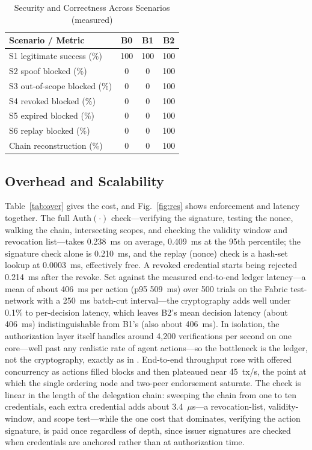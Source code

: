 \documentclass[conference]{IEEEtran}
\begin{document}
\begin{table}[t]
\centering
\caption{Security and Correctness Across Scenarios (measured)}
\label{tab:sec}
\renewcommand{\arraystretch}{1.2}
\begin{tabular}{@{}lccc@{}}
\toprule
\textbf{Scenario / Metric} & \textbf{B0} & \textbf{B1} & \textbf{B2}\\
\midrule
S1 legitimate success (\%)    & 100 & 100 & 100\\
S2 spoof blocked (\%)         & 0   & 0   & 100\\
S3 out-of-scope blocked (\%)  & 0   & 0   & 100\\
S4 revoked blocked (\%)       & 0   & 0   & 100\\
S5 expired blocked (\%)       & 0   & 0   & 100\\
S6 replay blocked (\%)        & 0   & 0   & 100\\
Chain reconstruction (\%)     & 0   & 0   & 100\\
\bottomrule
\end{tabular}
\end{table}

\subsection{Overhead and Scalability}
Table~\ref{tab:over} gives the cost, and Fig.~\ref{fig:res} shows enforcement and latency together. The full $\mathrm{Auth}(\cdot)$ check---verifying the signature, testing the nonce, walking the chain, intersecting scopes, and checking the validity window and revocation list---takes 0.238~ms on average, 0.409~ms at the 95th percentile; the signature check alone is 0.210~ms, and the replay (nonce) check is a hash-set lookup at 0.0003~ms, effectively free. A revoked credential starts being rejected 0.214~ms after the revoke. Set against the measured end-to-end ledger latency---a mean of about 406~ms per action (p95 509~ms) over 500 trials on the Fabric test-network with a 250~ms batch-cut interval---the cryptography adds well under 0.1\% to per-decision latency, which leaves B2's mean decision latency (about 406~ms) indistinguishable from B1's (also about 406~ms). In isolation, the authorization layer itself handles around 4{,}200 verifications per second on one core---well past any realistic rate of agent actions---so the bottleneck is the ledger, not the cryptography, exactly as in \cite{jan2025}. End-to-end throughput rose with offered concurrency as actions filled blocks and then plateaued near 45~tx/s, the point at which the single ordering node and two-peer endorsement saturate. The check is linear in the length of the delegation chain: sweeping the chain from one to ten credentials, each extra credential adds about 3.4~$\mu$s---a revocation-list, validity-window, and scope test---while the one cost that dominates, verifying the action signature, is paid once regardless of depth, since issuer signatures are checked when credentials are anchored rather than at authorization time.
\end{document}

